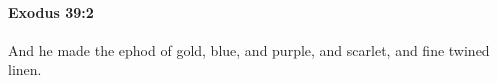 
		\paragraph{Exodus 39:2} %
			\label{EXODUS-39-2}

			And he made the ephod of gold, blue, and purple, and scarlet, and fine twined linen.


